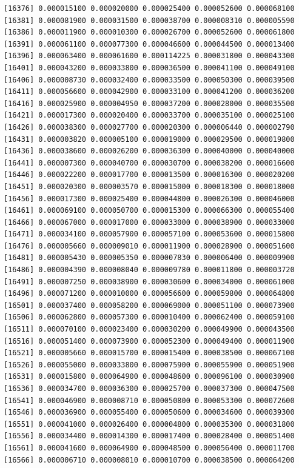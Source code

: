 \documentclass[]{article}
\begin{document}
\begin{verbatim}
[16376] 0.000015100 0.000020000 0.000025400 0.000052600 0.000068100
[16381] 0.000081900 0.000031500 0.000038700 0.000008310 0.000005590
[16386] 0.000011900 0.000010300 0.000026700 0.000052600 0.000061800
[16391] 0.000061100 0.000077300 0.000046600 0.000044500 0.000013400
[16396] 0.000063400 0.000061600 0.000114225 0.000031800 0.000043300
[16401] 0.000043200 0.000033800 0.000036500 0.000041100 0.000049100
[16406] 0.000008730 0.000032400 0.000033500 0.000050300 0.000039500
[16411] 0.000056600 0.000042900 0.000033100 0.000041200 0.000036200
[16416] 0.000025900 0.000004950 0.000037200 0.000028000 0.000035500
[16421] 0.000017300 0.000020400 0.000033700 0.000035100 0.000025100
[16426] 0.000038300 0.000027700 0.000020300 0.000006440 0.000002790
[16431] 0.000003820 0.000005100 0.000019000 0.000029500 0.000019800
[16436] 0.000038600 0.000026200 0.000036300 0.000040000 0.000040000
[16441] 0.000007300 0.000040700 0.000030700 0.000038200 0.000016600
[16446] 0.000022200 0.000017700 0.000013500 0.000016300 0.000020200
[16451] 0.000020300 0.000003570 0.000015000 0.000018300 0.000018000
[16456] 0.000017300 0.000025400 0.000044800 0.000026300 0.000046000
[16461] 0.000069100 0.000050700 0.000015300 0.000066300 0.000055400
[16466] 0.000067000 0.000017000 0.000033000 0.000038900 0.000033000
[16471] 0.000034100 0.000057900 0.000057100 0.000053600 0.000015800
[16476] 0.000005660 0.000009010 0.000011900 0.000028900 0.000051600
[16481] 0.000005430 0.000005350 0.000007830 0.000006400 0.000009900
[16486] 0.000004390 0.000008040 0.000009780 0.000011800 0.000003720
[16491] 0.000007250 0.000038900 0.000030600 0.000034000 0.000061000
[16496] 0.000071200 0.000010000 0.000056600 0.000059800 0.000064800
[16501] 0.000037400 0.000058200 0.000069000 0.000051100 0.000073900
[16506] 0.000062800 0.000057300 0.000010400 0.000062400 0.000059100
[16511] 0.000070100 0.000023400 0.000030200 0.000049900 0.000043500
[16516] 0.000051400 0.000073900 0.000052300 0.000049400 0.000011900
[16521] 0.000005660 0.000015700 0.000015400 0.000038500 0.000067100
[16526] 0.000055000 0.000033800 0.000075900 0.000055900 0.000051900
[16531] 0.000015800 0.000064900 0.000048600 0.000096100 0.000030900
[16536] 0.000034700 0.000036300 0.000025700 0.000037300 0.000047500
[16541] 0.000046900 0.000008710 0.000050800 0.000053300 0.000072600
[16546] 0.000036900 0.000055400 0.000050600 0.000034600 0.000039300
[16551] 0.000041000 0.000026400 0.000004800 0.000035300 0.000031800
[16556] 0.000034400 0.000014300 0.000017400 0.000028400 0.000051400
[16561] 0.000041600 0.000064900 0.000048500 0.000056400 0.000011700
[16566] 0.000006710 0.000008010 0.000010700 0.000038500 0.000064200

\end{verbatim}
\end{document}
